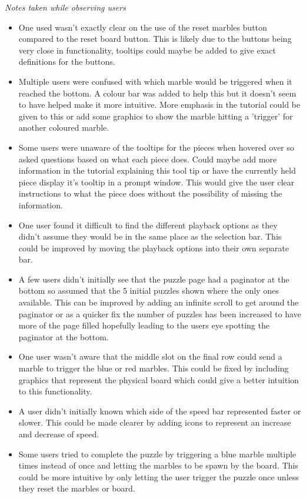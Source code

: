 \documentclass{l4proj}
\begin{document}
\emph{Notes taken while observing users}
\begin{itemize}
    \item One used wasn't exactly clear on the use of the reset marbles button compared to the reset board button. This is likely due to the buttons being very close in functionality, tooltips could maybe be added to give exact definitions for the buttons.
    \item Multiple users were confused with which marble would be triggered when it reached the bottom. A colour bar was added to help this but it doesn't seem to have helped make it more intuitive. More emphasis in the tutorial could be given to this or add some graphics to show the marble hitting a 'trigger' for another coloured marble.
    \item Some users were unaware of the tooltips for the pieces when hovered over so asked questions based on what each piece does. Could maybe add more information in the tutorial explaining this tool tip or have the currently held piece display it's tooltip in a prompt window. This would give the user clear instructions to what the piece does without the possibility of missing the information.
    \item One user found it difficult to find the different playback options as they didn't assume they would be in the same place as the selection bar. This could be improved by moving the playback options into their own separate bar. 
    \item A few users didn't initially see that the puzzle page had a paginator at the bottom so assumed that the 5 initial puzzles shown where the only ones available. This can be improved by adding an infinite scroll to get around the paginator or as a quicker fix the number of puzzles has been increased to have more of the page filled hopefully leading to the users eye spotting the paginator at the bottom.
    \item One user wasn't aware that the middle slot on the final row could send a marble to trigger the blue or red marbles. This could be fixed by including graphics that represent the physical board which could give a better intuition to this functionality.
    \item A user didn't initially known which side of the speed bar represented faster or slower. This could be made clearer by adding icons to represent an increase and decrease of speed.
    \item Some users tried to complete the puzzle by triggering a blue marble multiple times instead of once and letting the marbles to be spawn by the board. This could be more intuitive by only letting the user trigger the puzzle once unless they reset the marbles or board.

\end{itemize}
\end{document}
